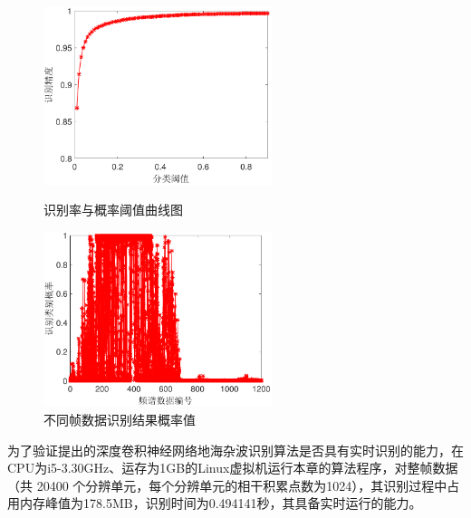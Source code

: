 \begin{figure}[hbt]
	\centering
	\begin{minipage}{7cm}
		\centering
		\includegraphics[width=6.67cm]{figures/othr/threashold}
		\caption{识别率与概率阈值曲线图}
		\label{fig:threshold}
	\end{minipage}
	\hspace{10pt}
	\begin{minipage}{7cm}
		\centering
		\includegraphics[width=6.67cm]{figures/othr/prob}
		\caption{不同帧数据识别结果概率值}
		\label{fig:prob}
	\end{minipage}

\end{figure}

为了验证提出的深度卷积神经网络地海杂波识别算法是否具有实时识别的能力，在CPU为i5-3.30GHz、运存为1GB的Linux虚拟机运行本章的算法程序，对整帧数据（共 20400 个分辨单元，每个分辨单元的相干积累点数为1024），其识别过程中占用内存峰值为178.5MB，识别时间为0.494141秒，其具备实时运行的能力。



